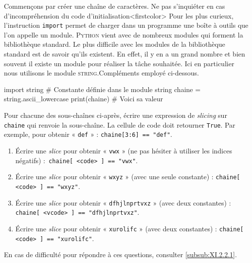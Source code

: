 \begin{exercise}[title={Séquences et {\itshape slicing}}, level=basic]
Commençons par créer une chaîne de caractères. Ne pas s'inquiéter en cas d'incompréhension du code d'initialisation\caution[c]<firstcolor>{%
Pour les plus curieux, l'instruction \texttt{import} permet de charger dans un programme une boîte à outils que l'on appelle un module. \textsc{Python} vient avec de nombreux modules qui forment la bibliothèque standard. Le plus difficile avec les modules de la bibliothèque standard est de savoir qu'ils existent. En effet, il y en a un grand nombre et bien souvent il existe un module pour réaliser la tâche souhaitée. Ici en particulier nous utilisons le module \textsc{string}.}{Compléments}
 employé ci-dessous. 


\begin{idleconsole}
\begin{pyconsole}
import string # Constante définie dans le module string
chaine = string.ascii_lowercase
print(chaine) # Voici sa valeur
\end{pyconsole}
\end{idleconsole}

Pour chacune des sous-chaînes ci-après, écrire une expression de \textit{slicing} sur \texttt{chaine} qui renvoie la sous-chaîne. La cellule de code doit retourner \texttt{True}. Par exemple, pour obtenir « \texttt{def} » : \texttt{chaine[3:6] == "def"}.
\begin{enumerate}
\item Écrire une \textit{slice} pour obtenir « \texttt{vwx} » (ne pas hésiter à utiliser les indices négatifs) :\texttt{ chaine[ <code> ] == "vwx"}.
\item Écrire une \textit{slice} pour obtenir « \texttt{wxyz} » (avec une seule constante) : \texttt{chaine[ <code> ] == "wxyz"}.
\item Écrire une \textit{slice} pour obtenir « \texttt{dfhjlnprtvxz} » (avec deux constantes) : \texttt{chaine[ <vcode> ] == "dfhjlnprtvxz"}.
\item Écrire une \textit{slice} pour obtenir « \texttt{xurolifc} » (avec deux constantes) : \texttt{chaine[ <code> ] == "xurolifc"}.
\end{enumerate}

En cas de difficulté pour répondre à ces questions, consulter \cref{subsub:XI.2.2.1}.
\end{exercise}

